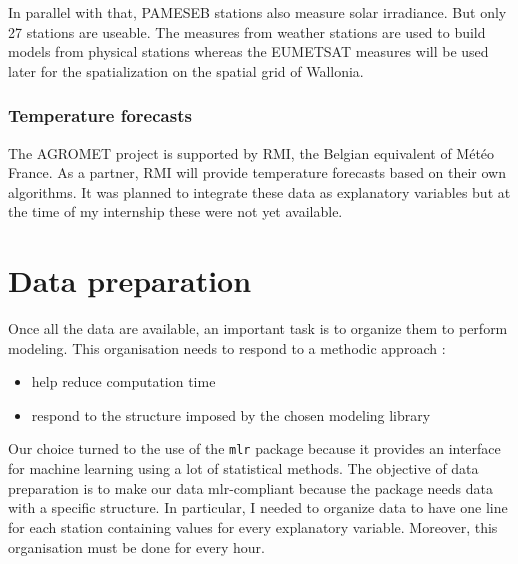 \documentclass[12pt,twoside]{reedthesis}
\providecommand{\tightlist}{%
  \setlength{\itemsep}{0pt}\setlength{\parskip}{0pt}}
\theoremstyle{definition}
\theoremstyle{definition}
\theoremstyle{definition}
\theoremstyle{remark}
\begin{document}
In parallel with that, PAMESEB stations also measure solar irradiance.
But only 27 stations are useable. The measures from weather stations are
used to build models from physical stations whereas the EUMETSAT
measures will be used later for the spatialization on the spatial grid
of Wallonia.

\subsubsection{Temperature forecasts}\label{temperature-forecasts}

The AGROMET project is supported by RMI, the Belgian equivalent of Météo
France. As a partner, RMI will provide temperature forecasts based on
their own algorithms. It was planned to integrate these data as
explanatory variables but at the time of my internship these were not
yet available.

\section{Data preparation}\label{data-preparation}

Once all the data are available, an important task is to organize them
to perform modeling. This organisation needs to respond to a methodic
approach :
\begin{itemize}
\tightlist
\item
  help reduce computation time
\item
  respond to the structure imposed by the chosen modeling library
\end{itemize}
Our choice turned to the use of the \texttt{mlr} package because it
provides an interface for machine learning using a lot of statistical
methods. The objective of data preparation is to make our data
mlr-compliant because the package needs data with a specific structure.
In particular, I needed to organize data to have one line for each
station containing values for every explanatory variable. Moreover, this
organisation must be done for every hour.
\end{document}

